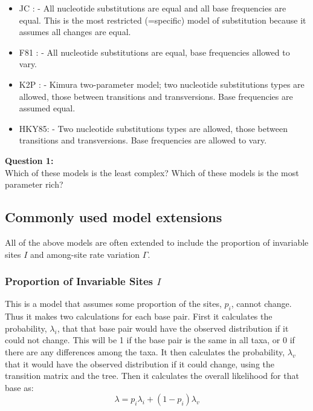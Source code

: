 \documentclass[11pt]{article}
\begin{document}
\begin{itemize}

\item JC : \citet{jukes1969evolution} - All nucleotide substitutions are equal and all base frequencies are equal. This is the most restricted (=specific) model of substitution because it assumes all changes are equal.

\item F81 : \citet{felsenstein1981evolutionary} - All nucleotide substitutions are equal, base frequencies allowed to vary.

\item K2P : \citet{kimura1980simple} - Kimura two-parameter model; two nucleotide substitutions types are allowed, those between transitions and transversions. Base frequencies are assumed equal.

\item HKY85: \citet{hasegawa1985dating} - Two nucleotide substitutions types are allowed, those between transitions and transversions.  Base frequencies are allowed to vary.

\end{itemize}


\begin{framed}
\noindent
\textbf{Question 1:} \\
Which of these models is the least complex?  Which of these models is the most parameter rich?
\end{framed}

\subsection{Commonly used model extensions}

All of the above models are often extended to include the proportion of invariable sites $I$
and among-site rate variation $\Gamma$.

\subsubsection{Proportion of Invariable Sites $I$}

This is a model that assumes some proportion of the sites, $p_i$, cannot change.  
Thus it makes two calculations for each base pair.  
First it calculates the probability, $\lambda_i$, that that base pair would have the observed distribution if it could not change.  
This will be 1 if the base pair is the same in all taxa, or 0 if there are any differences among the taxa.  
It then calculates the probability, $\lambda_v$ that it would have the observed distribution if it could change, 
using the transition matrix and the tree.  
Then it calculates the overall likelihood for that base as:
\begin{equation*}
\lambda = p_i \lambda_i + (1 - p_i) \lambda_v
\end{equation*}
\end{document}
